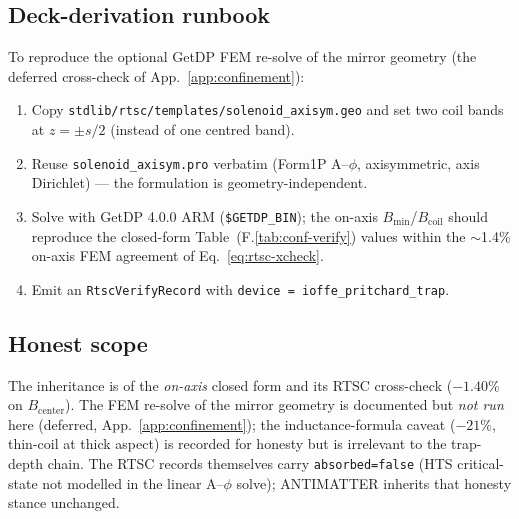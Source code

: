\subsection{Deck-derivation runbook}
\label{app:rtsc-runbook}

To reproduce the optional GetDP FEM re-solve of the mirror geometry (the
deferred cross-check of App.~\ref{app:confinement}):
\begin{enumerate}\itemsep0.2em
\item Copy \texttt{stdlib/rtsc/templates/solenoid\_axisym.geo} and set two
  coil bands at $z=\pm s/2$ (instead of one centred band).
\item Reuse \texttt{solenoid\_axisym.pro} verbatim (Form1P A--$\phi$,
  axisymmetric, axis Dirichlet) --- the formulation is geometry-independent.
\item Solve with GetDP 4.0.0 ARM (\texttt{\$GETDP\_BIN}); the on-axis
  $B_{\min}$/$B_{\mathrm{coil}}$ should reproduce the closed-form
  Table~(F.\ref{tab:conf-verify}) values within the $\sim$1.4\% on-axis FEM
  agreement of Eq.~\eqref{eq:rtsc-xcheck}.
\item Emit an \texttt{RtscVerifyRecord} with
  \texttt{device = ioffe\_pritchard\_trap}.
\end{enumerate}

\subsection{Honest scope}
\label{app:rtsc-scope}

The inheritance is of the \emph{on-axis} closed form and its RTSC cross-check
($-1.40\%$ on $B_{\mathrm{center}}$). The FEM re-solve of the mirror geometry
is documented but \emph{not run} here (deferred, App.~\ref{app:confinement});
the inductance-formula caveat ($-21\%$, thin-coil at thick aspect) is recorded
for honesty but is irrelevant to the trap-depth chain. The RTSC records
themselves carry \texttt{absorbed=false} (HTS critical-state not modelled in
the linear A--$\phi$ solve); ANTIMATTER inherits that honesty stance unchanged.

